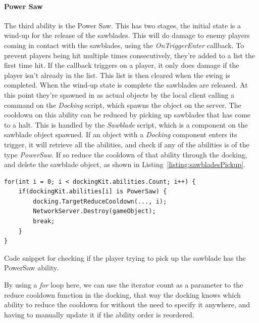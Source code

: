 \paragraph{Power Saw}
The third ability is the Power Saw. This has two stages, the initial state is a wind-up for the release of the sawblades. This will do damage to enemy players coming in contact with the sawblades, using the \emph{OnTriggerEnter} callback. To prevent players being hit multiple times consecutively, they're added to a list the first time hit. If the callback triggers on a player, it only does damage if the player isn't already in the list. This list is then cleared when the swing is completed. When the wind-up state is complete the sawblades are released. At this point they're spawned in as actual objects by the local client calling a command on the \emph{Docking} script, which spawns the object on the server. The cooldown on this ability can be reduced by picking up sawblades that has come to a halt. This is handled by the \emph{Sawblade} script, which is a component on the sawblade object spawned. If an object with a \emph{Docking} component enters its trigger, it will retrieve all the abilities, and check if any of the abilities is of the type \emph{PowerSaw}. If so reduce the cooldown of that ability through the docking, and delete the sawblade object, as shown in Listing~\ref{listing:sawbladesPickup}.


\begin{listing}[htb]
\begin{verbatim}
for(int i = 0; i < dockingKit.abilities.Count; i++) {
    if(dockingKit.abilities[i] is PowerSaw) {
        docking.TargetReduceCooldown(..., i);
        NetworkServer.Destroy(gameObject);
        break;
    }
}
\end{verbatim}
\caption[Check on sawblade pickup]{Code snippet for checking if the player trying to pick up the sawblade has the PowerSaw ability.}
\label{listing:sawbladesPickup}
\end{listing}

By using a \emph{for} loop here, we can use the iterator count as a parameter to the reduce cooldown function in the docking, that way the docking knows which ability to reduce the cooldown for without the need to specify it anywhere, and having to manually update it if the ability order is reordered.

